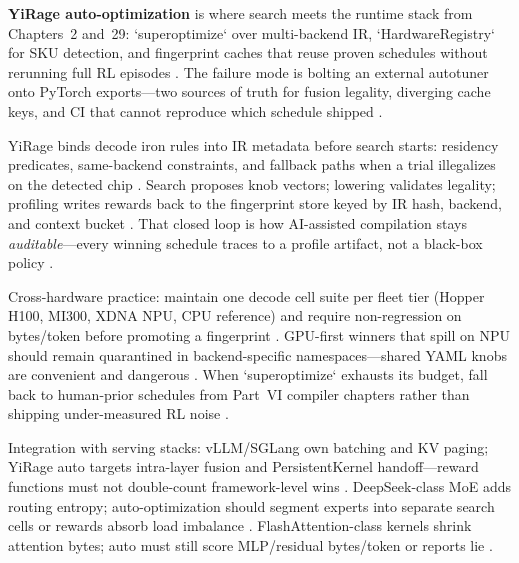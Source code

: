 \textbf{YiRage auto-optimization} is where search meets the runtime stack from Chapters~2 and~29: `superoptimize` over multi-backend IR, `HardwareRegistry` for SKU detection, and fingerprint caches that reuse proven schedules without rerunning full RL episodes \citep{yirage2026,chen2020compilerbasedhardw,kwon2023vllm}. The failure mode is bolting an external autotuner onto PyTorch exports---two sources of truth for fusion legality, diverging cache keys, and CI that cannot reproduce which schedule shipped \citep{patel2025llminference,yirage2026,taxbreak2026}.

YiRage binds decode iron rules into IR metadata before search starts: residency predicates, same-backend constraints, and fallback paths when a trial illegalizes on the detected chip \citep{yirage2026,liu2024deepseekv3,amd2024xdna}. Search proposes knob vectors; lowering validates legality; profiling writes rewards back to the fingerprint store keyed by IR hash, backend, and context bucket \citep{chen2020compilerbasedhardw,memoryfloor2026}. That closed loop is how AI-assisted compilation stays \emph{auditable}---every winning schedule traces to a profile artifact, not a black-box policy \citep{patel2025llminference,yirage2026,dlbook}.

Cross-hardware practice: maintain one decode cell suite per fleet tier (Hopper H100, MI300, XDNA NPU, CPU reference) and require non-regression on bytes/token before promoting a fingerprint \citep{amd2024xdna,semianalysis2024tma,dlbook,chen2020compilerbasedhardw}. GPU-first winners that spill on NPU should remain quarantined in backend-specific namespaces---shared YAML knobs are convenient and dangerous \citep{amd2024aie,yirage2026,amd2024xdna}. When `superoptimize` exhausts its budget, fall back to human-prior schedules from Part~VI compiler chapters rather than shipping under-measured RL noise \citep{chen2020compilerbasedhardw,memoryfloor2026,taxbreak2026}.

Integration with serving stacks: vLLM/SGLang own batching and KV paging; YiRage auto targets intra-layer fusion and PersistentKernel handoff---reward functions must not double-count framework-level wins \citep{kwon2023vllm,patel2025llminference,yirage2026}. DeepSeek-class MoE adds routing entropy; auto-optimization should segment experts into separate search cells or rewards absorb load imbalance \citep{liu2024deepseekv3,taxbreak2026}. FlashAttention-class kernels shrink attention bytes; auto must still score MLP/residual bytes/token or reports lie \citep{dao2022flashattention,dao2023flashdecoding,memoryfloor2026}.

